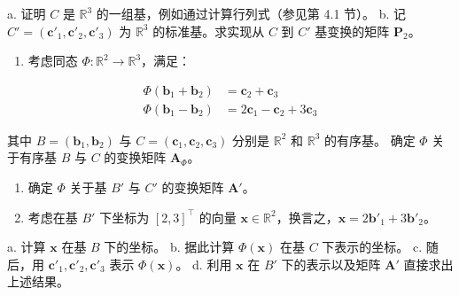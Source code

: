 a. 证明 $ C $ 是 $ \mathbb{R}^3 $ 的一组基，例如通过计算行列式（参见第 4.1 节）。 b. 记 $ C' = (\boldsymbol{c}'_1, \boldsymbol{c}'_2, \boldsymbol{c}'_3) $ 为 $ \mathbb{R}^3 $ 的标准基。求实现从 $ C $ 到 $ C' $ 基变换的矩阵 $ \boldsymbol{P}_2 $。

\begin{enumerate}
\item 考虑同态 $ \Phi : \mathbb{R}^2 \to \mathbb{R}^3 $，满足：
\end{enumerate}

\begin{equation*}
\begin{aligned}
\Phi(\boldsymbol{b}_1 + \boldsymbol{b}_2) &= \boldsymbol{c}_2 + \boldsymbol{c}_3 \\
\Phi(\boldsymbol{b}_1 - \boldsymbol{b}_2) &= 2\boldsymbol{c}_1 - \boldsymbol{c}_2 + 3\boldsymbol{c}_3
\end{aligned}
\end{equation*}

其中 $ B = (\boldsymbol{b}_1, \boldsymbol{b}_2) $ 与 $ C = (\boldsymbol{c}_1, \boldsymbol{c}_2, \boldsymbol{c}_3) $ 分别是 $ \mathbb{R}^2 $ 和 $ \mathbb{R}^3 $ 的有序基。 确定 $ \Phi $ 关于有序基 $ B $ 与 $ C $ 的变换矩阵 $ \boldsymbol{A}_{\Phi} $。

\begin{enumerate}
\item 确定 $ \Phi $ 关于基 $ B' $ 与 $ C' $ 的变换矩阵 $ \boldsymbol{A}' $。  
\item 考虑在基 $ B' $ 下坐标为 $ [2, 3]^\top $ 的向量 $ \boldsymbol{x} \in \mathbb{R}^2 $，换言之，$ \boldsymbol{x} = 2\boldsymbol{b}'_1 + 3\boldsymbol{b}'_2 $。
\end{enumerate}

a. 计算 $ \boldsymbol{x} $ 在基 $ B $ 下的坐标。 b. 据此计算 $ \Phi(\boldsymbol{x}) $ 在基 $ C $ 下表示的坐标。 c. 随后，用 $ \boldsymbol{c}'_1, \boldsymbol{c}'_2, \boldsymbol{c}'_3 $ 表示 $ \Phi(\boldsymbol{x}) $。 d. 利用 $ \boldsymbol{x} $ 在 $ B' $ 下的表示以及矩阵 $ \boldsymbol{A}' $ 直接求出上述结果。

